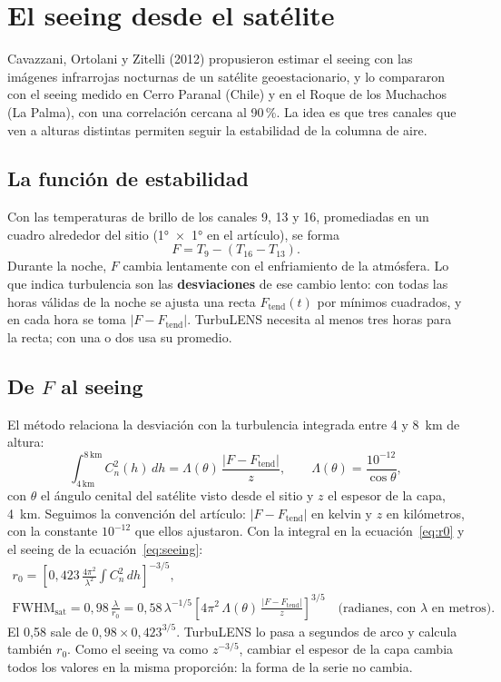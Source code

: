 \section{El seeing desde el satélite}\label{sec:metodo_cavazzani}

Cavazzani, Ortolani y Zitelli (2012) propusieron estimar el seeing con las imágenes infrarrojas nocturnas de un satélite
geoestacionario, y lo compararon con el seeing medido en Cerro Paranal (Chile) y en el Roque de los Muchachos (La Palma),
con una correlación cercana al 90\,\%. La idea es que tres canales que ven a alturas distintas permiten seguir la
estabilidad de la columna de aire.

\subsection{La función de estabilidad}

Con las temperaturas de brillo de los canales 9, 13 y 16, promediadas en un cuadro alrededor del sitio (1°~×~1° en el
artículo), se forma
\begin{equation}
F = T_9 - (T_{16} - T_{13}) .
\end{equation}
Durante la noche, $F$ cambia lentamente con el enfriamiento de la atmósfera. Lo que indica turbulencia son las
\textbf{desviaciones} de ese cambio lento: con todas las horas válidas de la noche se ajusta una recta $F_\text{tend}(t)$
por mínimos cuadrados, y en cada hora se toma $|F - F_\text{tend}|$. TurbuLENS necesita al menos tres horas para la recta;
con una o dos usa su promedio.

\subsection{De \texorpdfstring{$F$}{F} al seeing}

El método relaciona la desviación con la turbulencia integrada entre 4 y 8~km de altura:
\begin{equation}
\int_{4\,\text{km}}^{8\,\text{km}} C_n^2(h)\,dh = \Lambda(\theta)\,\frac{|F - F_\text{tend}|}{z},
\qquad \Lambda(\theta) = \frac{10^{-12}}{\cos\theta},
\end{equation}
con $\theta$ el ángulo cenital del satélite visto desde el sitio y $z$ el espesor de la capa, 4~km. Seguimos la
convención del artículo: $|F - F_\text{tend}|$ en kelvin y $z$ en kilómetros, con la constante $10^{-12}$ que ellos
ajustaron. Con la integral en la ecuación~\eqref{eq:r0} y el seeing de la ecuación~\eqref{eq:seeing}:
\begin{gather}
r_0 = \left[0{,}423\,\frac{4\pi^2}{\lambda^2}\int C_n^2\,dh\right]^{-3/5},\\
\text{FWHM}_\text{sat} = 0{,}98\,\frac{\lambda}{r_0}
= 0{,}58\,\lambda^{-1/5}\left[4\pi^2\,\Lambda(\theta)\,\frac{|F - F_\text{tend}|}{z}\right]^{3/5}
\quad\text{(radianes, con $\lambda$ en metros)} .
\end{gather}
El 0,58 sale de $0{,}98 \times 0{,}423^{3/5}$. TurbuLENS lo pasa a segundos de arco y calcula también $r_0$. Como el seeing
va como $z^{-3/5}$, cambiar el espesor de la capa cambia todos los valores en la misma proporción: la forma de la serie
no cambia.

